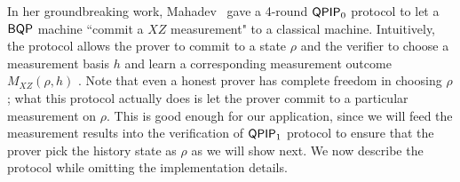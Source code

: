 In her groundbreaking work, Mahadev~\cite{FOCS:Mahadev18a} gave a 4-round $\operatorname{\mathsf{QPIP}}_0$ protocol to let a $\operatorname{\mathsf{BQP}}$ machine ``commit a $XZ$ measurement" to a classical machine.
Intuitively, the protocol allows the prover to commit to a state $\rho$ and the verifier to choose a measurement basis $h$ and learn a corresponding measurement outcome $M_{XZ}(\rho, h)$ .
Note that even a honest prover has complete freedom in choosing $\rho$;
what this protocol actually does is let the prover commit to a particular measurement on $\rho$.
This is good enough for our application, since we will feed the measurement results into the verification of $\operatorname{\mathsf{QPIP}}_1$ protocol to ensure that the prover pick the history state as $\rho$ as we will show next.
We now describe the protocol while omitting the implementation details.



